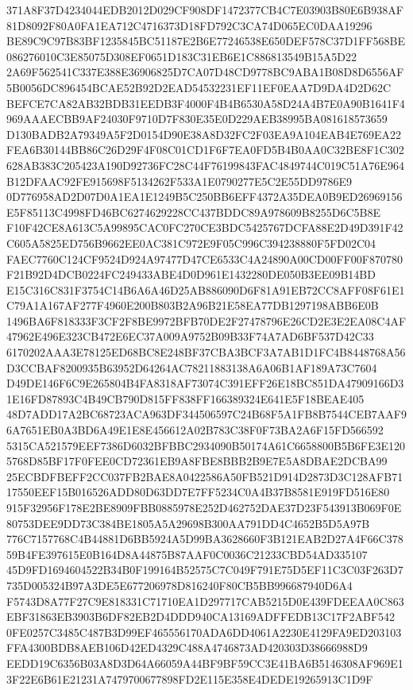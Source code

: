 \documentclass[UTF8,fontset=fandol,zihao=-4,a4paper]{ctexart}
\begin{document}
{{371A8F37D4234044EDB2012D029CF908DF1472377CB4C7E03903B80E6B938AF81D8092F80A0FA1EA712C4716373D18FD792C3CA74D065EC0DAA19296
BE89C9C97B83BF1235845BC51187E2B6E77246538E650DEF578C37D1FF568BE086276010C3E85075D308EF0651D183C31EB6E1C886813549B15A5D22
2A69F562541C337E388E36906825D7CA07D48CD9778BC9ABA1B08D8D6556AF5B0056DC896454BCAE52B92D2EAD54532231EF11EF0EAA7D9DA4D2D62C
BEFCE7CA82AB32BDB31EEDB3F4000F4B4B6530A58D24A4B7E0A90B1641F4969AAAECBB9AF24030F9710D7F830E35E0D229AEB38995BA081618573659
D130BADB2A79349A5F2D0154D90E38A8D32FC2F03EA9A104EAB4E769EA22FEA6B30144BB86C26D29F4F08C01CD1F6F7EA0FD5B4B0AA0C32BE8F1C302
628AB383C205423A190D92736FC28C44F76199843FAC4849744C019C51A76E964B12DFAAC92FE915698F5134262F533A1E0790277E5C2E55DD9786E9
0D776958AD2D07D0A1EA1E1249B5C250BB6EFF4372A35DEA0B9ED26969156E5F85113C4998FD46BC6274629228CC437BDDC89A978609B8255D6C5B8E
F10F42CE8A613C5A99895CAC0FC270CE3BDC5425767DCFA88E2D49D391F42C605A5825ED756B9662EE0AC381C972E9F05C996C394238880F5FD02C04
FAEC7760C124CF9524D924A97477D47CE6533C4A24890A00CD00FF00F870780F21B92D4DCB0224FC249433ABE4D0D961E1432280DE050B3EE09B14BD
E15C316C831F3754C14B6A6A46D25AB886090D6F81A91EB72CC8AFF08F61E1C79A1A167AF277F4960E200B803B2A96B21E58EA77DB1297198ABB6E0B
1496BA6F818333F3CF2F8BE9972BFB70DE2F27478796E26CD2E3E2EA08C4AF47962E496E323CB472E6EC37A009A9752B09B33F74A7AD6BF537D42C33
6170202AAA3E78125ED68BC8E248BF37CBA3BCF3A7AB1D1FC4B8448768A56D3CCBAF8200935B63952D64264AC78211883138A6A06B1AF189A73C7604
D49DE146F6C9E265804B4FA8318AF73074C391EFF26E18BC851DA47909166D31E16FD87893C4B49CB790D815FF838FF166389324E641E5F18BEAE405
48D7ADD17A2BC68723ACA963DF344506597C24B68F5A1FB8B7544CEB7AAF96A7651EB0A3BD6A49E1E8E456612A02B783C38F0F73BA2A6F15FD566592
5315CA521579EEF7386D6032BFBBC2934090B50174A61C6658800B5B6FE3E1205768D85BF17F0FEE0CD72361EB9A8FBE8BBB2B9E7E5A8DBAE2DCBA99
25ECBDFBEFF2CC037FB2BAE8A0422586A50FB521D914D2873D3C128AFB7117550EEF15B016526ADD80D63DD7E7FF5234C0A4B37B8581E919FD516E80
915F32956F178E2BE8909FBB0885978E252D462752DAE37D23F543913B069F0E80753DEE9DD73C384BE1805A5A29698B300AA791DD4C4652B5D5A97B
776C7157768C4B44881D6BB5924A5D99BA3628660F3B121EAB2D27A4F66C37859B4FE397615E0B164D8A44875B87AAF0C0036C21233CBD54AD335107
45D9FD1694604522B34B0F199164B52575C7C049F791E75D5EF11C3C03F263D7735D005324B97A3DE5E677206978D816240F80CB5BB996687940D6A4
F5743D8A77F27C9E818331C71710EA1D297717CAB5215D0E439FDEEAA0C863EBF31863EB3903B6DF82EB2D4DDD940CA13169ADFFEDB13C17F2ABF542
0FE0257C3485C487B3D99EF465556170ADA6DD4061A2230E4129FA9ED203103FFA4300BDB8AEB106D42ED4329C488A4746873AD420303D38666988D9
EEDD19C6356B03A8D3D64A66059A44BF9BF59CC3E41BA6B5146308AF969E13F22E6B61E21231A7479700677898FD2E115E358E4DEDE19265913C1D9F
}}
\end{document}

